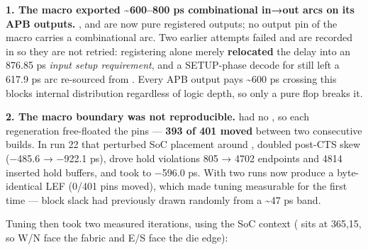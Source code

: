 \begin{record}

\textbf{1. The macro exported \textasciitilde600--800 ps combinational
in→out arcs on its APB outputs.} ,
 and  are now pure registered
outputs; no output pin of the macro carries a combinational arc. Two
earlier attempts failed and are recorded in  so
they are not retried: registering  alone merely
\textbf{relocated} the delay into an 876.85 ps \emph{input setup
requirement}, and a SETUP-phase decode for  still left a
617.9 ps arc re-sourced from . Every APB output pays
\textasciitilde600 ps crossing this block\textquotesingle s internal
distribution regardless of logic depth, so only a pure flop breaks it.

\textbf{2. The macro boundary was not reproducible.}
 had no , so each
regeneration free-floated the pins --- \textbf{393 of 401 moved} between
two consecutive builds. In run 22 that perturbed SoC placement around
, doubled post-CTS  skew (−485.6 → −922.1 ps),
drove hold violations 805 → 4702 endpoints and 4814 inserted hold
buffers, and took  to −596.0 ps. With 
two runs now produce a byte-identical LEF (0/401 pins moved), which made
tuning measurable for the first time --- block slack had previously
drawn randomly from a \textasciitilde47 ps band.

Tuning then took two measured iterations, using the SoC context
( sits at 365,15, so W/N face the fabric and E/S face the
die edge):


\end{record}
